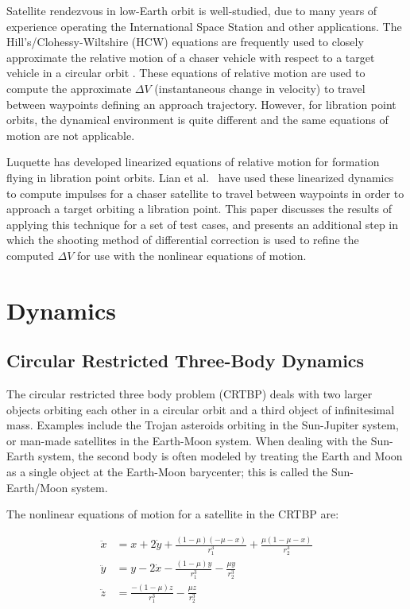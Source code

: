 \documentclass[letterpaper, preprint, paper,11pt]{AAS}	%
\begin{document}
Satellite rendezvous in low-Earth orbit is well-studied, due to many years of experience operating the International Space Station and other applications.  The Hill's/Clohessy-Wiltshire (HCW) equations are frequently used to closely approximate the relative motion of a chaser vehicle with respect to a target vehicle in a circular orbit \cite{clohessy1960}.  These equations of relative motion are used to compute the approximate \(\Delta V\) (instantaneous change in velocity) to travel between waypoints defining an approach trajectory.  However, for libration point orbits, the dynamical environment is quite different and the same equations of motion are not applicable.  %

Luquette \cite{luquette2004} has developed linearized equations of relative motion for formation flying in libration point orbits.  Lian et al.~\cite{lian2011} have used these linearized dynamics to compute impulses for a chaser satellite to travel between waypoints in order to approach a target orbiting a libration point.  This paper discusses the results of applying this technique for a set of test cases, and presents an additional step in which the shooting method of differential correction is used to refine the computed \(\Delta V\) for use with the nonlinear equations of motion.  %

\section{Dynamics}

\subsection{Circular Restricted Three-Body Dynamics}
The circular restricted three body problem (CRTBP) deals with two larger objects orbiting each other in a circular orbit and a third object of infinitesimal mass.  Examples include the Trojan asteroids orbiting in the Sun-Jupiter system, or man-made satellites in the Earth-Moon system.  When dealing with the Sun-Earth system, the second body is often modeled by treating the Earth and Moon as a single object at the Earth-Moon barycenter; this is called the Sun-Earth/Moon system.

The nonlinear equations of motion for a satellite in the CRTBP are:

\begin{equation} \label{eq:CRTBP}
	\begin{aligned}
		\ddot{x} &= x + 2\dot{y} + \frac{(1 - \mu)(-\mu - x)}{r_1^3} + \frac{\mu(1 - \mu - x)}{r_2^3} \\
		\ddot{y} &= y - 2\dot{x} - \frac{(1 - \mu)y}{r_1^3} - \frac{\mu y}{r_2^3} \\
		\ddot{z} &= \frac{-(1 - \mu)z}{r_1^3} - \frac{\mu z}{r_2^3}
	\end{aligned}
\end{equation}
\end{document}
